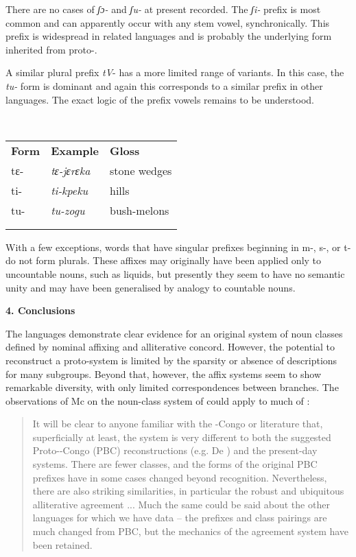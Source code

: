 \documentclass[output=paper]{langsci/langscibook}
\begin{document}
There are no cases of \textit{ʃɔ-} and \textit{ʃu-} at present recorded. The \textit{ʃi-} prefix is most common and can apparently occur with any stem vowel, synchronically. This prefix is widespread in related languages and is probably the underlying form inherited from proto-. 

A similar plural prefix \textit{tV}{}- has a more limited range of variants. In this case, the \textit{tu-} form is dominant and again this corresponds to a similar prefix in other languages. The exact logic of the prefix vowels remains to be understood.

\ea\label{ex:key:}
\\
\begin{tabularx}{\textwidth}{XXX}
\lsptoprule
\textbf{Form} & \textbf{Example} & \textbf{Gloss}\\
tɛ- &  \textit{tɛ-jɛrɛka} &  stone wedges\\
ti- &  \textit{ti-kpeku} &  hills\\
tu- &  \textit{tu-zogu} &  bush-melons\\
&  & \\
\lspbottomrule
\end{tabularx}
With a few exceptions, words that have singular prefixes beginning in m-, s-, or t- do not form plurals. These affixes may originally have been applied only to uncountable nouns, such as liquids, but presently they seem to have no semantic unity and may have been generalised by analogy to countable nouns. 

\textbf{4. Conclusions}

The  languages demonstrate clear evidence for an original system of noun classes defined by nominal affixing and alliterative concord. However, the potential to reconstruct a proto-system is limited by the sparsity or absence of descriptions for many subgroups. Beyond that, however, the affix systems seem to show remarkable diversity, with only limited correspondences between branches. The observations of Mc\citet{Gill2009} on the noun-class system of  could apply to much of :

\begin{quote}
{It will be clear to anyone familiar with the -Congo or  literature that, superficially at least, the  system is very different to both the suggested Proto--Congo (PBC) reconstructions (e.g. De \citealt{Wolf1971}) and the present-day  systems. There are fewer classes, and the forms of the original PBC prefixes have in some cases changed beyond recognition. Nevertheless, there are also striking similarities, in particular the robust and ubiquitous alliterative agreement ... Much the same could be said about the other  languages for which we have data – the prefixes and class pairings are much changed from PBC, but the mechanics of the agreement system have been retained.}
\end{quote}
\end{document}
